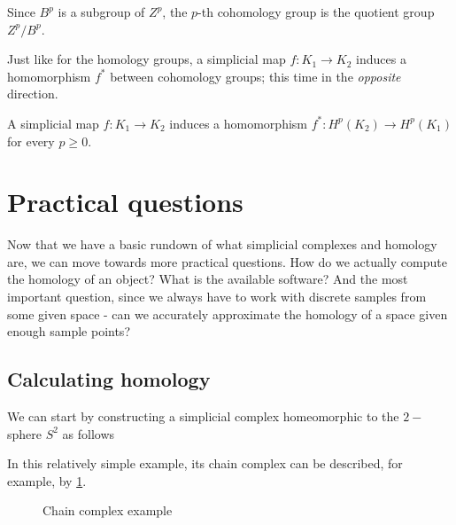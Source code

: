 \begin{definition}
  Since $B^{p}$ is a subgroup of $Z^{p}$, the $p$-th cohomology group is the quotient group $Z^{p} / B^{p}$.
\end{definition}

Just like for the homology groups, a simplicial map $f: K_{1} \to K_{2}$ induces a homomorphism $f^{*}$ between cohomology groups; this time in the \textit{opposite} direction.

\begin{lemma}
  A simplicial map $f: K_{1} \to K_{2}$ induces a homomorphism $f^{*}: H^{p}(K_{2}) \to H^{p}(K_{1})$ for every $p \geq 0$.
\end{lemma}

\section{Practical questions}

Now that we have a basic rundown of what simplicial complexes and homology are, we can move towards more practical questions. How do we actually compute the homology of an object? What is the available software? And the most important question, since we always have to work with discrete samples from some given space - can we accurately approximate the homology of a space given enough sample points?

\subsection{Calculating homology}

We can start by constructing a simplicial complex homeomorphic to the $2-$sphere $S^{2}$ as follows

\begin{figure}[h]
  \centering
\end{figure}

In this relatively simple example, its chain complex can be described, for example, by \ref{fig:chain_complex}.

\begin{figure}[h]
  \centering
  \caption{Chain complex example}
  \label{fig:chain_complex}
\end{figure}

